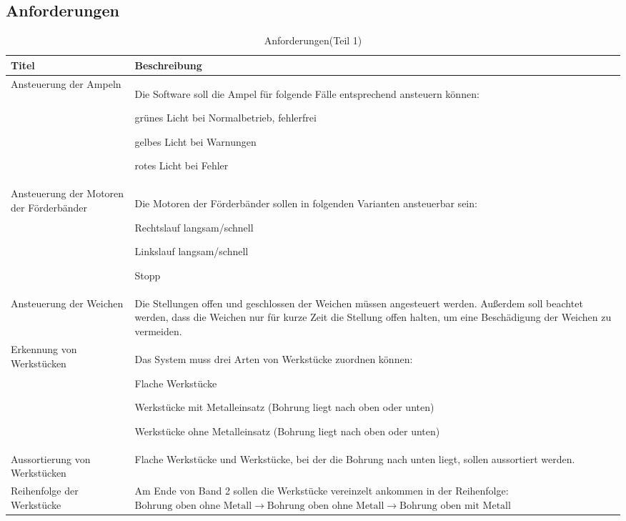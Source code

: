 \documentclass[a4paper, 11pt]{article}
\newcommand{\su}{\glqq} %
\newcommand{\so}{\grqq\xspace} %
\begin{document}
\newpage

\subsection{Anforderungen}
\begin{table}[h]
\center
\begin{tabularx}{\textwidth}{|X|X|}
\hline
\textbf{Titel}&\textbf{Beschreibung}\\
\hline
Ansteuerung der Ampeln&Die Software soll die Ampel für folgende Fälle entsprechend ansteuern können:
\begin{compactenum}[-]
\item grünes Licht bei Normalbetrieb, fehlerfrei 
\item gelbes Licht bei Warnungen 
\item rotes Licht bei Fehler 
\end{compactenum}\\
\hline
Ansteuerung der Motoren der Förderbänder&Die Motoren der Förderbänder sollen in folgenden Varianten ansteuerbar sein: 
\begin{compactenum}[-]
\item Rechtslauf langsam/schnell
\item Linkslauf langsam/schnell
\item Stopp
\end{compactenum}\\
\hline
Ansteuerung der Weichen&Die Stellungen \su offen\so und \su geschlossen\so der Weichen müssen angesteuert werden. Außerdem soll beachtet werden, dass die Weichen nur für kurze Zeit die Stellung \su offen\so halten, um eine Beschädigung der Weichen zu vermeiden.\\
\hline
Erkennung von Werkstücken&Das System muss drei Arten von Werkstücke zuordnen können: 
\begin{compactenum}[-]
\item Flache Werkstücke 
\item Werkstücke mit Metalleinsatz (Bohrung liegt nach oben oder unten) 
\item Werkstücke ohne Metalleinsatz (Bohrung liegt nach oben oder unten)
\end{compactenum}\\
\hline
Aussortierung von Werkstücken&Flache Werkstücke und Werkstücke, bei der die Bohrung nach unten liegt, sollen aussortiert werden. \\
\hline
Reihenfolge der Werkstücke&Am Ende von Band 2 sollen die Werkstücke vereinzelt ankommen in der Reihenfolge:\hspace{2cm}
$\text{Bohrung oben ohne Metall}\rightarrow \text{Bohrung oben ohne Metall}\rightarrow \text{Bohrung oben mit Metall}$ \\
\hline
\end{tabularx}
\caption{Anforderungen(Teil 1)}
\label{anf1}
\end{table}
\end{document}
